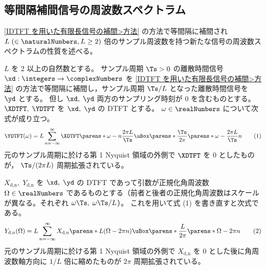         \subsection{等間隔補間信号の周波数スペクトラム}
            \newcommand*{\Xdn}{X_\text{d,n}}
            \newcommand*{\Ydn}{Y_\text{d,n}}
            \ref{IDTFT を用いた有限長信号の補間>方法} の方法で等間隔に補間され $L\;(\in\naturalNumbers,L\geq 2)$ 倍のサンプル周波数を持つ新たな信号の周波数スペクトラムの性質を述べる。
            \begin{shadebox}
                $L$ を 2 以上の自然数とする。
                サンプル周期 $\Ts>0$ の離散時間信号 $\xd:\integers\to\complexNumbers$ を \ref{IDTFT を用いた有限長信号の補間>方法} の方法で等間隔に補間し，サンプル周期 $\Ts/L$ となった離散時間信号を $\yd$ とする。
                但し $\xd,\;\yd$ 両方のサンプリング時刻が 0 を含むものとする。
                $\XDTFT,\;\YDTFT$ を $\xd,\;\yd$ の DTFT とする。
                $\omega\in\realNumbers$ について次式が成り立つ。
                \[ \YDTFT(\omega) = L\sum_{n=-\infty}^\infty \XDTFT\parens*{\omega-n\frac{2\pi L}{\Ts}}\uBox\parens*{\frac{\Ts}{2\pi}\parens*{\omega-\frac{2\pi L}{\Ts}n}} \tag{1} \]
                元のサンプル周期に於ける第 1 Nyquist 領域の外側で $\XDTFT$ を 0 としたものが， $\Ts/(2\pi L)$ 周期拡張されている。
                \par
                $\Xdn,\;\Ydn$ を $\xd,\;\yd$ の DTFT であって引数が正規化角周波数 $\Omega\in\realNumbers$ であるものとする（前者と後者の正規化角周波数はスケールが異なる。それぞれ $\omega\Ts,\;\omega\Ts/L$）。
                これを用いて式 (1) を書き直すと次式である。
                \[ \Ydn(\Omega) = L\sum_{n=-\infty}^\infty \Xdn\parens*{L(\Omega-2\pi n)}\uBox\parens*{\frac{L}{2\pi}\parens*{\Omega-2\pi n}} \tag{2} \]
                元のサンプル周期に於ける第 1 Nyquist 領域の外側で $\Xdn$ を 0 とした後に角周波数軸方向に $1/L$ 倍に縮めたものが $2\pi$ 周期拡張されている。
            \end{shadebox}
